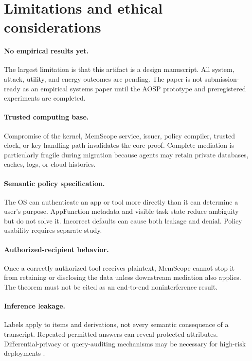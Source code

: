 \section{Limitations and ethical considerations}
\label{sec:limitations}

\paragraph{No empirical results yet.}
The largest limitation is that this artifact is a design manuscript. All system, attack, utility, and energy outcomes are pending. The paper is not submission-ready as an empirical systems paper until the AOSP prototype and preregistered experiments are completed.

\paragraph{Trusted computing base.}
Compromise of the kernel, MemScope service, issuer, policy compiler, trusted clock, or key-handling path invalidates the core proof. Complete mediation is particularly fragile during migration because agents may retain private databases, caches, logs, or cloud histories.

\paragraph{Semantic policy specification.}
The OS can authenticate an app or tool more directly than it can determine a user's purpose. AppFunction metadata and visible task state reduce ambiguity but do not solve it. Incorrect defaults can cause both leakage and denial. Policy usability requires separate study.

\paragraph{Authorized-recipient behavior.}
Once a correctly authorized tool receives plaintext, MemScope cannot stop it from retaining or disclosing the data unless downstream mediation also applies. The theorem must not be cited as an end-to-end noninterference result.

\paragraph{Inference leakage.}
Labels apply to items and derivations, not every semantic consequence of a transcript. Repeated permitted answers can reveal protected attributes. Differential-privacy or query-auditing mechanisms may be necessary for high-risk deployments \citep{kim2026dpmemview,dwork2014algorithmic}.

